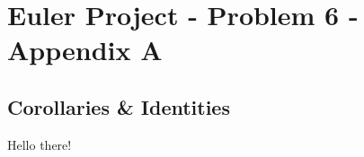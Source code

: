 \documentclass[]{article}
\begin{document}
\allowdisplaybreaks
\raggedbottom

\section*{Euler Project - Problem 6 - Appendix A}
\label{appendixa}
\subsection*{Corollaries \& Identities}

Hello there!
\end{document}
